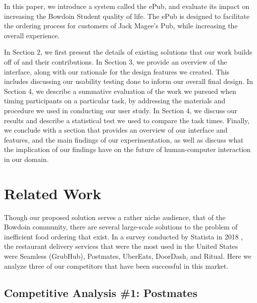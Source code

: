 \documentclass[runningheads]{llncs}
\begin{document}
In this paper, we introduce a system called the ePub, and evaluate its impact on increasing the Bowdoin Student quality of life. The ePub is designed to facilitate the ordering process for customers of Jack Magee’s Pub, while increasing the overall experience. 

In Section 2, we first present the details of existing solutions that our work builds off of and their contributions. In Section 3, we provide an overview of the interface, along with our rationale for the design features we created. This includes discussing our usability testing done to inform our overall final design. In Section 4, we describe a summative evaluation of the work we pursued when timing participants on a particular task, by addressing the materials and procedure we used in conducting our user study. In Section 4, we discuss our results and describe a statistical test we used to compare the task times. Finally, we conclude with a section that provides an overview of our interface and features, and the main findings of our experimentation, as well as discuss what the implication of our findings have on the future of human-computer interaction in our domain. 

\section{Related Work}

Though our proposed solution serves a rather niche audience, that of the Bowdoin community, there are several large-scale solutions to the problem of inefficient food ordering that exist. In a survey conducted by Statista in 2018 \cite{statista}, the restaurant delivery services that were the most used in the United States were Seamless (GrubHub), Postmates, UberEats, DoorDash, and Ritual. Here we analyze three of our competitors that have been successful in this market. 

\subsection{Competitive Analysis \#1: Postmates}
\end{document}
